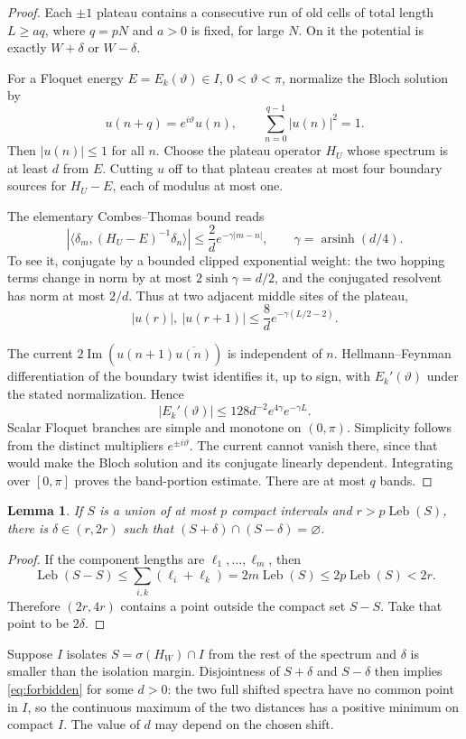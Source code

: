 \documentclass[11pt,a4paper]{article}
\numberwithin{equation}{section}
\newtheorem{lemma}[theorem]{Lemma}
\theoremstyle{remark}
\newcommand{\spec}{\sigma}
\newcommand{\Leb}{\operatorname{Leb}}
\begin{document}
\begin{proof}
Each $\pm1$ plateau contains a consecutive run of old cells
of total length $L\ge a q$, where $q=pN$ and $a>0$ is fixed,
for large $N$. On it the potential is exactly $W+\delta$
or $W-\delta$.

For a Floquet energy $E=E_k(\vartheta)\in I$,
$0<\vartheta<\pi$, normalize the Bloch solution by
\[
u(n+q)=e^{i\vartheta}u(n),\qquad
\sum_{n=0}^{q-1}|u(n)|^2=1.
\]
Then $|u(n)|\le1$ for all $n$. Choose the plateau operator
$H_U$ whose spectrum is at least $d$ from $E$. Cutting $u$
off to that plateau creates at most four boundary sources
for $H_U-E$, each of modulus at most one.

The elementary Combes--Thomas bound reads
\[
|\langle\delta_m,(H_U-E)^{-1}\delta_n\rangle|
\le\frac2d e^{-\gamma|m-n|},
\qquad \gamma=\operatorname{arsinh}(d/4).
\]
To see it, conjugate by a bounded clipped exponential weight:
the two hopping terms change in norm by at most
$2\sinh\gamma=d/2$, and the conjugated resolvent has norm
at most $2/d$. Thus at two adjacent middle sites of the
plateau,
\[
|u(r)|,\ |u(r+1)|\le\frac8d e^{-\gamma(L/2-2)}.
\]

The current $2\operatorname{Im}(u(n+1)\overline{u(n)})$
is independent of $n$. Hellmann--Feynman differentiation
of the boundary twist identifies it, up to sign, with
$E_k'(\vartheta)$ under the stated normalization. Hence
\[
|E_k'(\vartheta)|
\le128d^{-2}e^{4\gamma}e^{-\gamma L}.
\]
Scalar Floquet branches are simple and monotone on $(0,\pi)$.
Simplicity follows from the distinct multipliers
$e^{\pm i\vartheta}$. The current cannot vanish there,
since that would make the Bloch solution and its conjugate
linearly dependent. Integrating over $[0,\pi]$ proves the
band-portion estimate. There are at most $q$ bands.
\end{proof}

\begin{lemma}\label{lem:shift}
If $S$ is a union of at most $p$ compact intervals and
$r>p\Leb(S)$, there is $\delta\in(r,2r)$ such that
$(S+\delta)\cap(S-\delta)=\varnothing$.
\end{lemma}
\begin{proof}
If the component lengths are $\ell_1,\ldots,\ell_m$, then
\[
\Leb(S-S)\le\sum_{i,k}(\ell_i+\ell_k)
=2m\Leb(S)\le2p\Leb(S)<2r.
\]
Therefore $(2r,4r)$ contains a point outside the compact set
$S-S$. Take that point to be $2\delta$.
\end{proof}

Suppose $I$ isolates $S=\spec(H_W)\cap I$ from the rest of
the spectrum and $\delta$ is smaller than the isolation
margin. Disjointness of $S+\delta$ and $S-\delta$ then
implies \eqref{eq:forbidden} for some $d>0$: the two full
shifted spectra have no common point in $I$, so the
continuous maximum of the two distances has a positive
minimum on compact $I$. The value of $d$ may depend on
the chosen shift.
\end{document}

